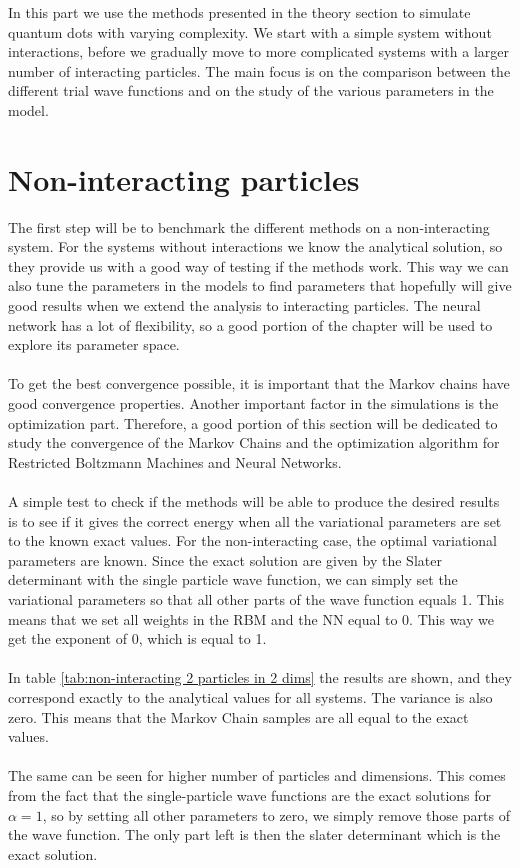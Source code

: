 In this part we use the methods presented in the theory section to simulate quantum dots with varying complexity. We start with a simple system without interactions, before we gradually move to more complicated systems with a larger number of interacting particles. The main focus is on the comparison between the different trial wave functions and on the study of the various parameters in the model.

\section{Non-interacting particles}
The first step will be to benchmark the different methods on a non-interacting system. For the systems without interactions we know the analytical solution, so they provide us with a good way of testing if the methods work. This way we can also tune the parameters in the models to find parameters that hopefully will give good results when we extend the analysis to interacting particles. The neural network has a lot of flexibility, so a good portion of the chapter will be used to explore its parameter space.  
\\
\\
To get the best convergence possible, it is important that the Markov chains have good convergence properties.  Another important factor in the simulations is the optimization part. Therefore, a good portion of this section will be dedicated to study the convergence of the Markov Chains and the optimization algorithm for Restricted Boltzmann Machines and Neural Networks.
\\
\\
A simple test to check if the methods will be able to produce the desired results is to see if it gives the correct energy when all the variational parameters are set to the known exact values. For the non-interacting case, the optimal variational parameters are known. Since the exact solution are given by the Slater determinant with the single particle wave function, we can simply set the variational parameters so that all other parts of the wave function equals 1. This means that we set all weights in the RBM and the NN equal to 0. This way we get the exponent of 0, which is equal to 1. 
\\
\\
In table \ref{tab:non-interacting 2 particles in 2 dims} the results are shown, and they correspond exactly to the analytical values for all systems. The variance is also zero. This means that the Markov Chain samples are all equal to the exact values. 
\\
\\
The same can be seen for higher number of particles and dimensions. This comes from the fact that the single-particle wave functions are the exact solutions for $\alpha = 1$, so by setting all other parameters to zero, we simply remove those parts of the wave function. The only part left is then the slater determinant which is the exact solution.  

